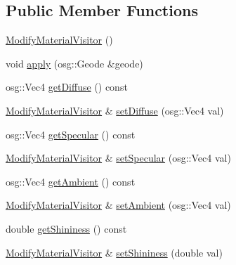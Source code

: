 \subsection*{Public Member Functions}
\begin{DoxyCompactItemize}
\item 
\hyperlink{classbrtr_1_1_modify_material_visitor_a240eed8002f7c81d8cd63aaaf4037381}{Modify\+Material\+Visitor} ()
\item 
void \hyperlink{classbrtr_1_1_modify_material_visitor_a74bf42fdfffbc1f7d433c1199f563ccb}{apply} (osg\+::\+Geode \&geode)
\item 
osg\+::\+Vec4 \hyperlink{classbrtr_1_1_modify_material_visitor_ac79c5aeaa29e381e46e130c088966ad9}{get\+Diffuse} () const 
\item 
\hyperlink{classbrtr_1_1_modify_material_visitor}{Modify\+Material\+Visitor} \& \hyperlink{classbrtr_1_1_modify_material_visitor_a17748f6a7f41431832da66dd65e1c41f}{set\+Diffuse} (osg\+::\+Vec4 val)
\item 
osg\+::\+Vec4 \hyperlink{classbrtr_1_1_modify_material_visitor_a5be2b7553a9ecbe1c6d50425119f7e9e}{get\+Specular} () const 
\item 
\hyperlink{classbrtr_1_1_modify_material_visitor}{Modify\+Material\+Visitor} \& \hyperlink{classbrtr_1_1_modify_material_visitor_a7a8a5a938799c5193645d86aa6dc6a7c}{set\+Specular} (osg\+::\+Vec4 val)
\item 
osg\+::\+Vec4 \hyperlink{classbrtr_1_1_modify_material_visitor_a2a87910d4f316359eb6bf75620edf947}{get\+Ambient} () const 
\item 
\hyperlink{classbrtr_1_1_modify_material_visitor}{Modify\+Material\+Visitor} \& \hyperlink{classbrtr_1_1_modify_material_visitor_adfaa00524e765fdf3ddc5968187623cd}{set\+Ambient} (osg\+::\+Vec4 val)
\item 
double \hyperlink{classbrtr_1_1_modify_material_visitor_a68f37fe264bd8f51e1d7a37f8048b103}{get\+Shininess} () const 
\item 
\hyperlink{classbrtr_1_1_modify_material_visitor}{Modify\+Material\+Visitor} \& \hyperlink{classbrtr_1_1_modify_material_visitor_a698aa0c31f8c5add503d47bc9898eec3}{set\+Shininess} (double val)
\end{DoxyCompactItemize}
